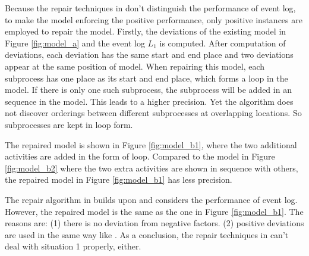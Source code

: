 Because the repair techniques in \cite{fahland2015model} don't distinguish the performance of event log, to make the model enforcing the positive performance, only positive instances are employed to repair the model. Firstly, the deviations of the existing model in Figure \ref{fig:model_a} and the event log $L_1$ is computed. After computation of deviations, each deviation has the same start and end place and two deviations appear at the same position of model. When repairing this model, each subprocess has one place as its start and end place, which forms a loop in the model. If there is only one such subprocess, the subprocess will be added in an sequence in the model. This leads to a higher precision. Yet the algorithm does not discover orderings between different subprocesses at overlapping locations. So subprocesses are kept in loop form. 

The repaired model is shown in Figure \ref{fig:model_b1}, where the two additional activities are added in the form of loop.  Compared to the model in Figure \ref{fig:model_b2} where the two extra activities are shown in sequence with others, the repaired model in Figure \ref{fig:model_b1} has less precision.

The repair algorithm in \cite{dees2017enhancing} builds upon \cite{fahland2015model} and considers the performance of event log. However, the repaired model is the same as the one in Figure \ref{fig:model_b1}. The reasons are: (1) there is no deviation from negative factors. (2) positive deviations are used in the same way like \cite{fahland2015model}. As a conclusion, the repair techniques in \cite{dees2017enhancing} can't deal with situation 1 properly, either. 

